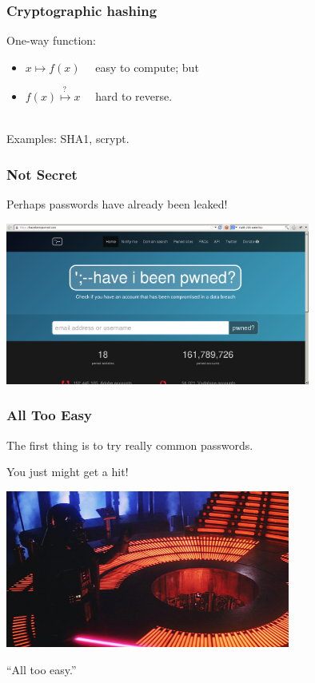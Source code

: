 \begin{frame}
  \frametitle{Cryptographic hashing}
  
    One-way function:
    \begin{itemize}
    \item $x \mapsto f(x)$ ~~easy to compute; but
      \item $f(x) \stackrel{?~}{\mapsto} x$ ~~hard to reverse.
    \end{itemize}~\\
    Examples: SHA1, scrypt.

\end{frame}


\begin{frame}
\frametitle{Not Secret}
Perhaps passwords have already been leaked!

\begin{center}
	\includegraphics[width=0.75\textwidth]{images/haveibeenpwned.png}
\end{center}


\end{frame}


\begin{frame}
\frametitle{All Too Easy}

The first thing is to try really common passwords.

You just might get a hit!

\begin{center}
	\includegraphics[width=0.7\textwidth]{images/alltooeasy.jpg}
\end{center}

``All too easy.''

\end{frame}


